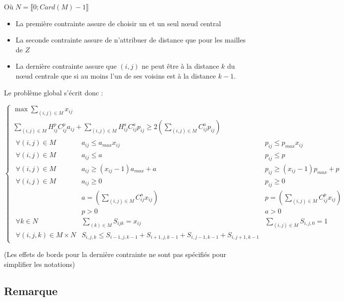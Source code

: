 \documentclass[a4paper,11pt] {article}
\begin{document}
Où $N = \llbracket 0;Card(M)-1\rrbracket$

\begin{itemize}
\item La première contrainte assure de choisir un et un seul nœud central
\item La seconde contrainte assure de n'attribuer de distance que pour les mailles de $Z$
\item La dernière contrainte assure que $(i,j)$ ne peut être à la distance $k$ du nœud centrale que si au moins l'un de ses voisins est à la distance $k-1$.
\end{itemize}

Le problème global s'écrit donc : 

\begin{equation}
\left\{
\begin{array}{l}
\max \sum\limits_{(i,j)\in M} x_{ij}\\
\sum\limits_{(i,j)\in M} H^p_{ij}C^p_{ij}a_{ij} + \sum\limits_{(i,j)\in M} H^a_{ij}C^a_{ij}p_{ij} \geq 2(\sum\limits_{(i,j)\in M} C^a_{ij}p_{ij})\\
	\begin{array}{lll}
		\forall{(i,j)} \in M&a_{ij}\leq a_{max}x_{ij}&p_{ij}\leq p_{max}x_{ij}\\
		\forall{(i,j)} \in M&a_{ij}\leq a&p_{ij}\leq p\\
		\forall{(i,j)} \in M&a_{ij}\geq (x_{ij}-1)a_{max}+a&p_{ij}\geq (x_{ij}-1)p_{max}+p\\
		\forall{(i,j)} \in M&a_{ij} \geq 0&p_{ij} \geq 0\\
		&a = (\sum\limits_{(i,j)\in M} C^a_{ij}x_{ij})&p = (\sum\limits_{(i,j)\in M} C^p_{ij}x_{ij})\\
		&p > 0&a > 0\\
		\forall{k} \in N&\sum\limits_{(k)\in M} S_{ijk} = x_{ij}&\sum\limits_{(i,j)\in M} S_{i,j,0} = 1\\
		\forall{(i,j,k)} \in M \times N&S_{i,j,k}\leq S_{i-1,j,k-1} + S_{i+1,j,k-1} + S_{i,j-1,k-1} + S_{i,j+1,k-1}
	\end{array}
	
\end{array}
\right.
\end{equation}

(Les effets de bords pour la dernière contrainte ne sont pas spécifiés pour simplifier les notations)

\subsection{Remarque}
\end{document}
